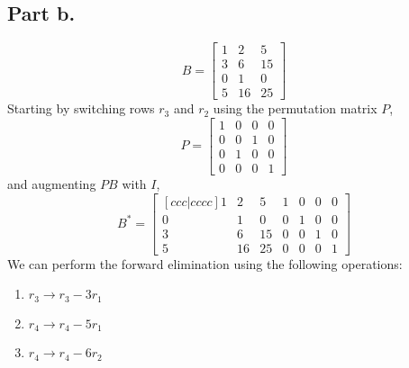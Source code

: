 \subsection{Part b.}
\begin{equation}
    B =
    \begin{bmatrix}
        1           &           2       &       5   \\
        3           &           6       &       15  \\
        0           &           1       &       0   \\
        5           &           16      &       25  
    \end{bmatrix}
\end{equation}
Starting by switching rows $r_{3}$ and $r_{2}$ using the permutation matrix 
$P$,
\begin{equation}
    P =
    \begin{bmatrix}
        1       &   0   &   0   &   0   \\
        0       &   0   &   1   &   0   \\
        0       &   1   &   0   &   0   \\
        0       &   0   &   0   &   1 
    \end{bmatrix}
\end{equation}
and augmenting $PB$ with $I$,
\begin{equation}
    B^{\ast} =
    \begin{bmatrix}[ccc|cccc]
        1           &           2       &       5       &       1   &   0   &   0   &   0   \\       
        0           &           1       &       0       &       0   &   1   &   0   &   0   \\        
        3           &           6       &       15      &       0   &   0   &   1   &   0   \\        
        5           &           16      &       25      &       0   &   0   &   0   &   1        
    \end{bmatrix}
\end{equation}
We can perform the forward elimination using the following operations:
\begin{enumerate}[label=(\arabic*)]
    \item $r_{3} \rightarrow r_{3} - 3r_{1} $
    \item $r_{4} \rightarrow r_{4} - 5r_{1} $
    \item $r_{4} \rightarrow r_{4} - 6r_{2} $
\end{enumerate}
